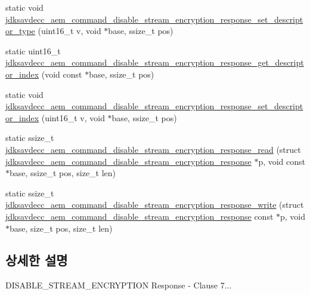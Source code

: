 \begin{DoxyCompactItemize}
\item 
static void \hyperlink{group__command__disable__stream__encryption__response_ga7affde1d3606b5444b9e26b7ae973601}{jdksavdecc\+\_\+aem\+\_\+command\+\_\+disable\+\_\+stream\+\_\+encryption\+\_\+response\+\_\+set\+\_\+descriptor\+\_\+type} (uint16\+\_\+t v, void $\ast$base, ssize\+\_\+t pos)
\item 
static uint16\+\_\+t \hyperlink{group__command__disable__stream__encryption__response_ga8f3f8650c4849e321fef206c2d160b56}{jdksavdecc\+\_\+aem\+\_\+command\+\_\+disable\+\_\+stream\+\_\+encryption\+\_\+response\+\_\+get\+\_\+descriptor\+\_\+index} (void const $\ast$base, ssize\+\_\+t pos)
\item 
static void \hyperlink{group__command__disable__stream__encryption__response_ga1722721f61828485c903699667c85848}{jdksavdecc\+\_\+aem\+\_\+command\+\_\+disable\+\_\+stream\+\_\+encryption\+\_\+response\+\_\+set\+\_\+descriptor\+\_\+index} (uint16\+\_\+t v, void $\ast$base, ssize\+\_\+t pos)
\item 
static ssize\+\_\+t \hyperlink{group__command__disable__stream__encryption__response_gabc0833f55df16dca2ebf687dd42262c1}{jdksavdecc\+\_\+aem\+\_\+command\+\_\+disable\+\_\+stream\+\_\+encryption\+\_\+response\+\_\+read} (struct \hyperlink{structjdksavdecc__aem__command__disable__stream__encryption__response}{jdksavdecc\+\_\+aem\+\_\+command\+\_\+disable\+\_\+stream\+\_\+encryption\+\_\+response} $\ast$p, void const $\ast$base, ssize\+\_\+t pos, size\+\_\+t len)
\item 
static ssize\+\_\+t \hyperlink{group__command__disable__stream__encryption__response_ga372119b9606e2f3c89f10b768027c7d9}{jdksavdecc\+\_\+aem\+\_\+command\+\_\+disable\+\_\+stream\+\_\+encryption\+\_\+response\+\_\+write} (struct \hyperlink{structjdksavdecc__aem__command__disable__stream__encryption__response}{jdksavdecc\+\_\+aem\+\_\+command\+\_\+disable\+\_\+stream\+\_\+encryption\+\_\+response} const $\ast$p, void $\ast$base, size\+\_\+t pos, size\+\_\+t len)
\end{DoxyCompactItemize}


\subsection{상세한 설명}
D\+I\+S\+A\+B\+L\+E\+\_\+\+S\+T\+R\+E\+A\+M\+\_\+\+E\+N\+C\+R\+Y\+P\+T\+I\+ON Response -\/ Clause 7... 

